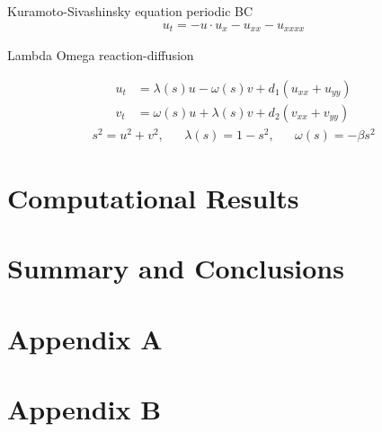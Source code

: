 \documentclass[10pt]{article}
\begin{document}
Kuramoto-Sivashinsky equation
periodic BC
\begin{align*}
    u_t = -u \cdot u_x - u_{xx} - u_{xxxx}
\end{align*}

Lambda Omega reaction-diffusion
\iffalse
\begin{align*}
\pp{}{t} \left[\begin{array}{c}u \\ v\end{array}\right]
=
\left[\begin{array}{cc}
    \lambda(s) & -\omega(s) \\
    \omega(s) & \lambda(s)
\end{array}\right]
\left[\begin{array}{c}u \\ v\end{array}\right]
+
\left[\begin{array}{cc}d_1 \\ & d_2 \end{array}\right]
\nabla^2
\left[\begin{array}{c}u \\ v\end{array}\right]
\end{align*}
\fi
\begin{align*}
    u_t &= \lambda(s) u - \omega(s) v + d_1(u_{xx}+u_{yy}) \\
    v_t &= \omega(s) u + \lambda(s) v + d_2(v_{xx}+v_{yy})
\end{align*}
\begin{align*}
    s^2 = u^2 + v^2, &&
    \lambda(s) = 1-s^2, &&
    \omega(s) = -\beta s^2
\end{align*}
\section{Computational Results}


\section{Summary and Conclusions}

\pagebreak



\onecolumn
\section{Appendix A}
\label{AppendixA}
%

\pagebreak
\section{Appendix B}
%
%
\end{document}
